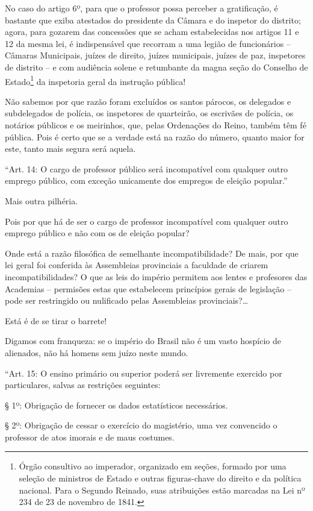 No caso do artigo 6º, para que o professor possa perceber a
gratificação, é bastante que exiba atestados do presidente da Câmara e
do inspetor do distrito; agora, para gozarem das concessões que se acham
estabelecidas nos artigos 11 e 12 da mesma lei, é indispensável que
recorram a uma legião de funcionários -- Câmaras Municipais, juízes de
direito, juízes municipais, juízes de paz, inspetores de distrito -- e
com audiência solene e retumbante da magna seção do Conselho de
Estado\footnote{Órgão consultivo ao imperador, organizado em seções,
  formado por uma seleção de ministros de Estado e outras figuras-chave
  do direito e da política nacional. Para o Segundo Reinado, suas
  atribuições estão marcadas na Lei nº 234 de 23 de novembro de 1841.}
da inspetoria geral da instrução pública!

Não sabemos por que razão foram excluídos os santos párocos, os
delegados e subdelegados de polícia, os inspetores de quarteirão, os
escrivães de polícia, os notários públicos e os meirinhos, que, pelas
Ordenações do Reino, também têm fé pública. Pois é certo que se a
verdade está na razão do número, quanto maior for este, tanto mais
segura será aquela.

``Art. 14: O cargo de professor público será incompatível com qualquer
outro emprego público, com exceção unicamente dos empregos de eleição
popular.''

Mais outra pilhéria.

Pois por que há de ser o cargo de professor incompatível com qualquer
outro emprego público e não com os de eleição popular?

Onde está a razão filosófica de semelhante incompatibilidade? De mais,
por que lei geral foi conferida às Assembleias provinciais a faculdade
de criarem incompatibilidades? O que as leis do império permitem aos
lentes e profesores das Academias -- permisões estas que estabelecem
princípios gerais de legislação -- pode ser restringido ou nulificado
pelas Assembleias provinciais?\ldots

Está é de se tirar o barrete!

Digamos com franqueza: se o império do Brasil não é um vasto hospício de
alienados, não há homens sem juízo neste mundo.

``Art. 15: O ensino primário ou superior poderá ser livremente exercido
por particulares, salvas as restrições seguintes:

§ 1º: Obrigação de fornecer os dados estatísticos necessários.

§ 2º: Obrigação de cessar o exercício do magistério, uma vez convencido
o professor de atos imorais e de maus costumes.

